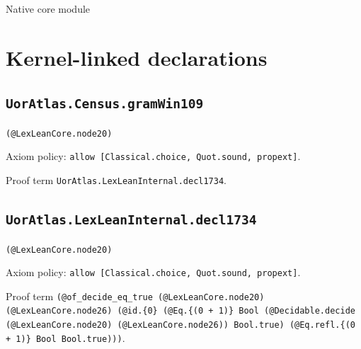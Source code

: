 \documentclass[11pt]{article}
\begin{document}
\begin{center}{\LARGE Native core module}\end{center}
\section*{Kernel-linked declarations}
\subsection*{\texttt{UorAtlas.Census.gramWin109}}
\noindent\texttt{(@LexLeanCore.node20)}\par
\noindent Axiom policy: \texttt{allow [Classical.choice, Quot.sound, propext]}.\par
\noindent Proof term \texttt{UorAtlas.LexLeanInternal.decl1734}.\par
\subsection*{\texttt{UorAtlas.LexLeanInternal.decl1734}}
\noindent\texttt{(@LexLeanCore.node20)}\par
\noindent Axiom policy: \texttt{allow [Classical.choice, Quot.sound, propext]}.\par
\noindent Proof term \texttt{(@of\_decide\_eq\_true (@LexLeanCore.node20) (@LexLeanCore.node26) (@id.\{0\} (@Eq.\{(0 + 1)\} Bool (@Decidable.decide (@LexLeanCore.node20) (@LexLeanCore.node26)) Bool.true) (@Eq.refl.\{(0 + 1)\} Bool Bool.true)))}.\par
\end{document}

